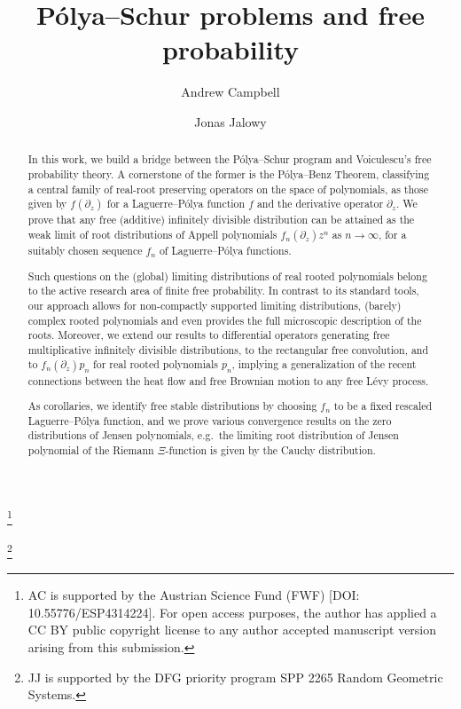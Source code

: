 \documentclass[reqno]{amsart}
\newcommand{\1}{\mathbf{1}}
\theoremstyle{plain}
\theoremstyle{definition}
\theoremstyle{remark}
\numberwithin{equation}{section}
\begin{document}
	
	\title{P\'olya--Schur problems and free probability}%
	
		\author{Andrew Campbell}
		\address[Andrew Campbell]{Institute of Science and Technology Austria, Am Campus 1, 3400 Klosterneuburg, Austria}
		\thanks{AC is supported by the Austrian Science Fund (FWF) [DOI: 10.55776/ESP4314224]. For open access purposes, the author has applied a CC BY public copyright license to any author accepted manuscript version arising from this submission.}
		
		\author{Jonas Jalowy}
		\address[Jonas Jalowy]{Paderborn University, Institute of Mathematics, Warburger Str. 100, 33098 Paderborn, Germany}
		\thanks{JJ is supported by the DFG priority program SPP 2265 Random Geometric Systems.}
		

	\begin{abstract}
	In this work, we build a bridge between the P\'olya--Schur program and Voiculescu's free probability theory. A cornerstone of the former is the P\'olya--Benz Theorem, classifying a central family of real-root preserving operators on the space of polynomials, as those given by $f(\partial_z)$ for a Laguerre--P\'olya function $f$ and the derivative operator $\partial_{z}$. We prove that any free (additive) infinitely divisible distribution can be attained as the weak limit of root distributions of Appell polynomials $f_n(\partial_z)z^n$ as $n\to\infty$, for a suitably chosen sequence $f_n$ of Laguerre--P\'olya functions. 
	
	Such questions on the (global) limiting distributions of real rooted polynomials belong to the active research area of finite free probability.  In contrast to its standard tools, our approach allows for  non-compactly supported limiting distributions,  (barely) complex rooted polynomials and even provides the full microscopic description of the roots. Moreover, we extend our results to differential operators generating free multiplicative infinitely divisible distributions, to the rectangular free convolution, and to $f_n(\partial_z)p_n$ for real rooted polynomials $p_n$, implying a generalization of the recent connections between the heat flow and free Brownian motion to any free L\'evy process. 
	
	As corollaries, we identify free stable distributions by choosing $f_n$ to be a fixed rescaled Laguerre--P\'olya function, and we prove various convergence results on the zero distributions of Jensen polynomials, e.g.\ the limiting root distribution of Jensen polynomial of the Riemann $\Xi$-function is given by the Cauchy distribution. 
	\end{abstract}
	
\end{document}

